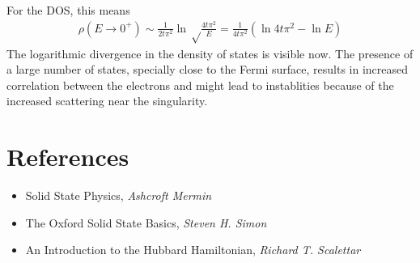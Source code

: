 \documentclass{article}
\begin{document}
For the DOS, this means
\begin{equation}\begin{aligned}
	\rho(E \to 0^+) \sim \frac{1}{2t\pi^2} \ln \sqrt\frac{4t\pi^2}{E} = \frac{1}{4t\pi^2}\left(\ln 4t\pi^2 - \ln E\right) 
\end{aligned}\end{equation}
The logarithmic divergence in the density of states is visible now. The presence of a large number of states, specially close to the Fermi surface, results in increased correlation between the electrons and might lead to instablities because of the increased scattering near the singularity.

\section{References}
\begin{itemize}
	\item Solid State Physics, \textit{Ashcroft Mermin}
	\item The Oxford Solid State Basics, \textit{Steven H. Simon}
	\item An Introduction to the Hubbard Hamiltonian, \textit{Richard T. Scalettar}
\end{itemize}
\end{document}
